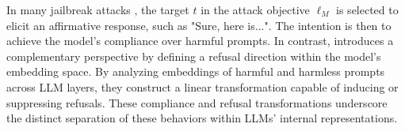In many jailbreak attacks \cite{liu2023autodan, zou2023universal, jia2024improved}, the target $t$ in the attack objective $\ell_M$ is selected to elicit an affirmative response, such as "Sure, here is...". The intention is then to achieve the model's compliance over harmful prompts. In contrast, \citet{arditi2024refusal} introduces a complementary perspective by defining a refusal direction within the model’s embedding space. By analyzing embeddings of harmful and harmless prompts across LLM layers, they construct a linear transformation capable of inducing or suppressing refusals. These compliance and refusal transformations underscore the distinct separation of these behaviors within LLMs' internal representations.









